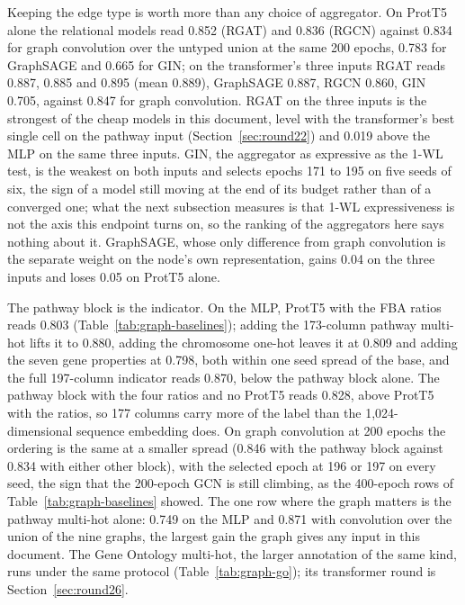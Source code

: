 

Keeping the edge type is worth more than any choice of aggregator. On ProtT5 alone
the relational models read 0.852 (RGAT) and 0.836 (RGCN) against 0.834 for graph
convolution over the untyped union at the same 200 epochs, 0.783 for GraphSAGE and
0.665 for GIN; on the transformer's three inputs RGAT reads 0.887, 0.885 and 0.895
(mean 0.889), GraphSAGE 0.887, RGCN 0.860, GIN 0.705, against 0.847 for graph
convolution. RGAT on the three inputs is the strongest of the cheap models in this
document, level with the transformer's best single cell on the pathway input
(Section~\ref{sec:round22}) and 0.019 above the MLP on the same three inputs. GIN, the
aggregator as expressive as the 1-WL test, is the weakest on both inputs and selects
epochs 171 to 195 on five seeds of six, the sign of a model still moving at the end
of its budget rather than of a converged one; what the next subsection measures is
that 1-WL expressiveness is not the axis this endpoint turns on, so the ranking of
the aggregators here says nothing about it. GraphSAGE, whose only difference from
graph convolution is the separate weight on the node's own representation, gains
0.04 on the three inputs and loses 0.05 on ProtT5 alone.



The pathway block is the indicator. On the MLP, ProtT5 with the FBA ratios reads 0.803
(Table~\ref{tab:graph-baselines}); adding the 173-column pathway multi-hot lifts it to
0.880, adding the chromosome one-hot leaves it at 0.809 and adding the seven gene
properties at 0.798, both within one seed spread of the base, and the full 197-column
indicator reads 0.870, below the pathway block alone. The pathway block with the four
ratios and no ProtT5 reads 0.828, above ProtT5 with the ratios, so 177 columns carry
more of the label than the 1,024-dimensional sequence embedding does. On graph
convolution at 200 epochs the ordering is the same at a smaller spread (0.846 with the
pathway block against 0.834 with either other block), with the selected epoch at 196 or
197 on every seed, the sign that the 200-epoch GCN is still climbing, as the 400-epoch
rows of Table~\ref{tab:graph-baselines} showed. The one row where the graph matters is
the pathway multi-hot alone: 0.749 on the MLP and 0.871 with convolution over the union
of the nine graphs, the largest gain the graph gives any input in this document.
The Gene Ontology multi-hot, the larger annotation of the same kind, runs under the
same protocol (Table~\ref{tab:graph-go}); its transformer round is
Section~\ref{sec:round26}.

